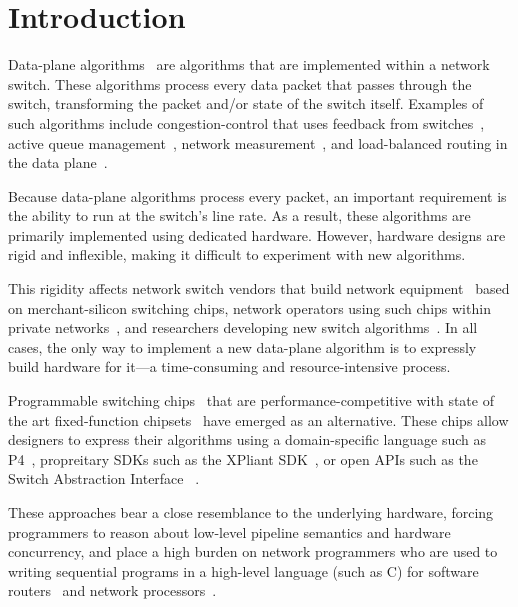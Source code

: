 \section{Introduction}
\label{s:intro}

Data-plane algorithms~\cite{cestan} are algorithms that are implemented within
a network switch. These algorithms process every data packet that passes
through the switch, transforming the packet and/or state of the switch itself.
Examples of such algorithms include congestion-control that uses feedback from
switches~\cite{xcp, rcp, pdq, dctcp}, active queue management~\cite{codel},
network measurement~\cite{opensketch, bitmap_george, elephant_george}, and
load-balanced routing in the data plane~\cite{conga}.

Because data-plane algorithms process every packet, an important requirement is
the ability to run at the switch's line rate.  As a result, these algorithms
are primarily implemented using dedicated hardware. However, hardware designs
are rigid and inflexible, making it difficult to experiment with new
algorithms.

This rigidity affects network switch vendors that build network
equipment~\cite{cisco_nexus, dell_force10, arista_7050} based on
merchant-silicon switching chips,  network operators using such chips within
private networks~\cite{jupiter,amazon,isp}, and researchers developing new
switch algorithms~\cite{xcp, codel, d3, detail, pdq}. In all cases, the only
way to implement a new data-plane algorithm is to expressly build hardware for
it---a time-consuming and resource-intensive process.

Programmable switching chips~\cite{flexpipe, xpliant, rmt} that are
performance-competitive with state of the art fixed-function
chipsets~\cite{trident, tomahawk, mellanox} have emerged as an alternative.
These chips allow designers to express their algorithms using a domain-specific
language such as P4~\cite{p4}, propreitary SDKs such as the XPliant
SDK~\cite{xpliant_sdk}, or open APIs such as the Switch Abstraction Interface
~\cite{sai}.

These approaches bear a close resemblance to the underlying hardware, forcing
programmers to reason about low-level pipeline semantics and hardware
concurrency, and place a high burden on network programmers who are used to
writing sequential programs in a high-level language (such as C) for software
routers~\cite{click} and network processors~\cite{packetc, ixp, microenginec,
nova}.


